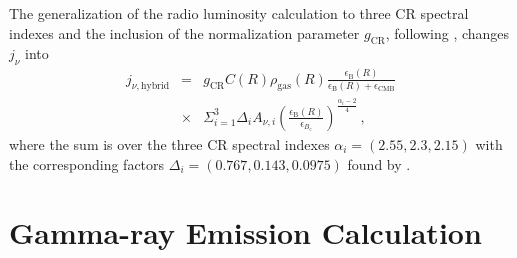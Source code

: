 \documentclass[traditabstract]{aa}
\newcommand{\rmn}{\mathrm}
\begin{document}
\begin{appendix}

The generalization of the radio luminosity calculation to three CR spectral indexes and the inclusion of the normalization parameter $g_{\rmn{CR}}$, following \cite{2010MNRAS.409..449P}, changes $j_{\nu}$ into
%
\begin{eqnarray}
j_{\nu,\rmn{hybrid}} & = &g_{\rmn{CR}} C(R) \rho_{\rmn{gas}}(R) \frac{\epsilon_{\rmn{B}}(R)}{\epsilon_{\rmn{B}}(R)+\epsilon_{\rmn{CMB}}} \nonumber \\
& \times & \Sigma_{i=1}^{3} \Delta_{i} A_{\nu,i} \left( \frac{\epsilon_{\rmn{B}}(R)}{\epsilon_{B_{\rmn{c}}}} \right)^{\frac{\alpha_{i}-2}{4}}  \, ,
\end{eqnarray}
%
where the sum is over the three CR spectral indexes $\alpha_{i}=(2.55,2.3,2.15)$ with the corresponding factors $\Delta_{i} = (0.767, 0.143, 0.0975)$ found by \cite{2010MNRAS.409..449P}. 
 


\section{Gamma-ray Emission Calculation}
\label{app:C}


\end{appendix}
\end{document}
